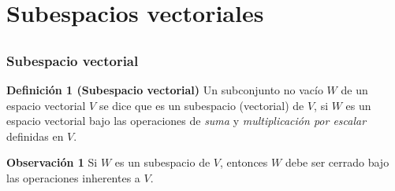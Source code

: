 \section{Subespacios vectoriales}

\subsection{}

\begin{frame}\frametitle{Subespacio vectorial}

\begin{block}{\textbf{Definición 1 (Subespacio vectorial)}}	
	\justifying
	Un subconjunto no vacío $W$ de un espacio vectorial $V$ se dice que es un {\color{red} subespacio (vectorial)} 
	de $V$, si $W$ es un espacio vectorial bajo las operaciones de \textit{suma} y \textit{multiplicación por escalar} definidas en $V$.
\end{block}


\begin{alertblock}{\textbf{Observación 1}}\justifying
	Si $W$ es un subespacio de $V$, entonces $W$ debe ser cerrado bajo las operaciones inherentes a $V$.
\end{alertblock}

\end{frame}


\subsection{}

